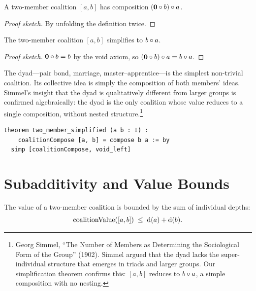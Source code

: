 \begin{theorem}
\label{thm:two-member}
A two-member coalition $[a, b]$ has composition
$(\mathbf{0} \circ b) \circ a$.
\end{theorem}

\begin{proof}[Proof sketch]
By unfolding the definition twice.
\end{proof}

\begin{theorem}
\label{thm:two-member-simp}
The two-member coalition $[a, b]$ simplifies to $b \circ a$.
\end{theorem}

\begin{proof}[Proof sketch]
$\mathbf{0} \circ b = b$ by the void axiom, so
$(\mathbf{0} \circ b) \circ a = b \circ a$.
\end{proof}

The dyad---pair bond, marriage, master--apprentice---is the simplest
non-trivial coalition.  Its collective idea is simply the composition of
both members' ideas.  Simmel's insight that the dyad is qualitatively
different from larger groups is confirmed algebraically: the dyad is the
only coalition whose value reduces to a single composition, without nested
structure.\footnote{Georg Simmel, ``The Number of Members as Determining the
Sociological Form of the Group'' (1902).  Simmel argued that the dyad lacks
the super-individual structure that emerges in triads and larger groups.
Our simplification theorem confirms this: $[a, b]$ reduces to $b \circ a$,
a simple composition with no nesting.}

\begin{lstlisting}[caption={Two-member coalition simplified in Lean~4}]
theorem two_member_simplified (a b : I) :
    coalitionCompose [a, b] = compose b a := by
  simp [coalitionCompose, void_left]
\end{lstlisting}

\section{Subadditivity and Value Bounds}
\label{sec:ch13-bounds}

\begin{theorem}
\label{thm:pair-subadd}
The value of a two-member coalition is bounded by the sum of individual
depths:
\[
  \operatorname{coalitionValue}([a, b]) \;\le\; \operatorname{d}(a) + \operatorname{d}(b).
\]
\end{theorem}

